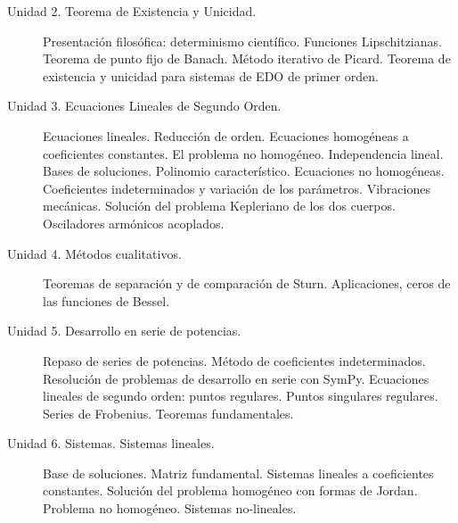\documentclass[12pt]{article}
\begin{document}
\begin{enumerate}
\begin{description}
\item[Unidad 2. Teorema de Existencia y Unicidad.] Presentación filosófica: determinismo científico. Funciones Lipschitzianas. Teorema de punto fijo de Banach. Método iterativo de Picard. Teorema de existencia y unicidad para sistemas de EDO de primer orden.

\item[Unidad 3. Ecuaciones Lineales de Segundo Orden.] Ecuaciones lineales. Reducción de orden. Ecuaciones homogéneas a coeficientes constantes. El problema no homogéneo. Independencia lineal. Bases de soluciones. Polinomio característico. Ecuaciones no homogéneas. Coeficientes indeterminados y variación de los parámetros. Vibraciones mecánicas. Solución del problema Kepleriano de los dos cuerpos. Osciladores armónicos acoplados.

\item[Unidad 4. Métodos cualitativos.] Teoremas de separación y de comparación de Sturn. Aplicaciones, ceros de las funciones de Bessel.

\item[Unidad 5. Desarrollo en serie de potencias.] Repaso de series de potencias. Método de coeficientes indeterminados.  Resolución de problemas de desarrollo en serie con  SymPy.   Ecuaciones lineales de segundo orden: puntos regulares. Puntos singulares regulares. Series de Frobenius. Teoremas fundamentales.

\item[Unidad 6. Sistemas. Sistemas lineales.]  Base de soluciones. Matriz fundamental. Sistemas lineales a coeficientes constantes. Solución del problema homogéneo con formas de Jordan. Problema no homogéneo. Sistemas no-lineales.

\end{description}


\end{enumerate}
\end{document}
